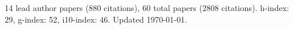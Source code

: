 14 lead author papers (880 citations),
60 total papers (2808 citations).\newline
h-index: 29, g-index: 52, i10-index: 46. Updated \today.